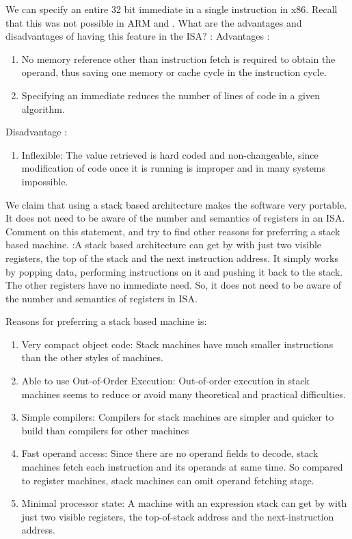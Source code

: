\begin{ExerciseList}
\Exercise[difficulty=1]
We can specify an entire 32 bit immediate in a single instruction in x86. Recall that this was not possible in ARM
and \simplerisc. What are the advantages and disadvantages of having this feature in the ISA?
\Answer:
Advantages : 
\begin{enumerate}
\item No memory reference other than instruction fetch is required to obtain the operand, thus saving one memory or cache cycle in the instruction cycle.
\item Specifying an immediate reduces the number of lines of code in a given algorithm.
\end{enumerate}
Disadvantage :
\begin{enumerate}
\item Inflexible: The value retrieved is hard coded and non-changeable, since modification of code once it is running is improper and in many systems impossible.
\end{enumerate} 

\Exercise [difficulty=1]
We claim that using a stack based architecture makes the software very portable. It does not need to be aware of 
the number and semantics of registers in an ISA. Comment on this statement, and try to find other reasons
for preferring a stack based machine.
\Answer:A stack based architecture can get by with just two visible registers, the top of the stack and the next instruction address. It simply works by popping data, performing instructions on it and pushing it back to the stack. The other registers have no immediate need. So, it does not need to be aware of the number and semantics of registers in ISA.

Reasons for preferring a stack based machine is:
\begin{enumerate}
\item Very compact object code: Stack machines have much smaller instructions than the other styles of machines.  
\item Able to use Out-of-Order Execution: Out-of-order execution in stack machines seems to reduce or avoid many theoretical and practical difficulties.
\item Simple compilers: Compilers for stack machines are simpler and quicker to build than compilers for other machines
\item Fast operand access: Since there are no operand fields to decode, stack machines fetch each instruction and its operands at same time. So compared to register machines, stack machines can omit operand fetching stage.
\item Minimal processor state: A machine with an expression stack can get by with just two visible registers, the top-of-stack address and the next-instruction address.
\end{enumerate}


\end{ExerciseList}
